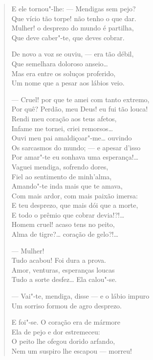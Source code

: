 \begin{verse}
E ele tornou"-lhe: --- Mendigas sem pejo?\\
Que vício tão torpe! não tenho o que dar.\\
Mulher! o desprezo do mundo é partilha,\\
Que deve caber"-te, que deves cobrar.

De novo a voz se ouviu, --- era tão débil,\\
Que semelhara doloroso anseio\ldots{}\\
Mas era entre os soluços proferido,\\
Um nome que a pesar aos lábios veio.

--- Cruel! por que te amei com tanto extremo,\\
Por quê? Perdão, meu Deus! eu fui tão louca!\\
Rendi meu coração aos teus afetos,\\
Infame me tornei, criei remorsos\ldots{}\\
Ouvi meu pai amaldiçoar"-me\ldots{} ouvindo\\
Os sarcasmos do mundo; --- e apesar d'isso\\
Por amar"-te eu sonhava uma esperança!\ldots{}\\
Vaguei mendiga, sofrendo dores,\\
Fiel ao sentimento de minh'alma,\\
Amando"-te inda mais que te amava,\\
Com mais ardor, com mais paixão imersa:\\
E teu desprezo, que mais dói que a morte,\\
E todo o prêmio que cobrar devia!?!\ldots{}\\
Homem cruel! acaso tens no peito,\\
Alma de tigre?\ldots{} coração de gelo?!\ldots{}

\pagebreak

--- Mulher!\\
Tudo acabou! Foi dura a prova.\\
Amor, venturas, esperanças loucas\\
Tudo a sorte desfez\ldots{} Ela calou"-se.

--- Vai"-te, mendiga, disse --- e o lábio impuro\\
Um sorriso formou de agro desprezo.

E foi"-se. O coração era de mármore\\
Ela de pejo e dor estremeceu:\\
O peito lhe ofegou dorido arfando,\\
Nem um suspiro lhe escapou --- morreu!
\end{verse}

